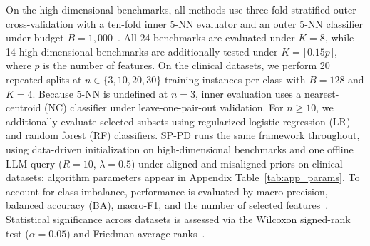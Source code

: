 On the high-dimensional benchmarks, all methods use three-fold stratified outer cross-validation with a ten-fold inner 5-NN evaluator and an outer 5-NN classifier under budget $B = 1{,}000$~\cite{wang2024mel,tran2019vlpso,li2023mfcso}. All 24 benchmarks are evaluated under $K = 8$, while 14 high-dimensional benchmarks are additionally tested under $K = \lfloor 0.15p \rfloor$, where $p$ is the number of features. On the clinical datasets, we perform 20 repeated splits at $n \in \{3, 10, 20, 30\}$ training instances per class with $B = 128$ and $K = 4$. Because 5-NN is undefined at $n = 3$, inner evaluation uses a nearest-centroid (NC) classifier under leave-one-pair-out validation. For $n \ge 10$, we additionally evaluate selected subsets using regularized logistic regression (LR) and random forest (RF) classifiers. SP-PD runs the same framework throughout, using data-driven initialization on high-dimensional benchmarks and one offline LLM query ($R = 10$, $\lambda = 0.5$) under aligned and misaligned priors on clinical datasets; algorithm parameters appear in Appendix Table~\ref{tab:app_params}. To account for class imbalance, performance is evaluated by macro-precision, balanced accuracy (BA), macro-F1, and the number of selected features~\cite{xue2016survey}. Statistical significance across datasets is assessed via the Wilcoxon signed-rank test ($\alpha = 0.05$) and Friedman average ranks~\cite{demsar2006stats}.
